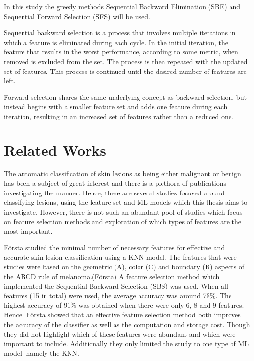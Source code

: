 \documentclass{kththesis}
\begin{document}
In this study the greedy methods Sequential Backward Elimination (SBE) and Sequential Forward Selection (SFS) will be used.

Sequential backward selection is a process that involves multiple iterations in which a feature is eliminated during each cycle. In the initial iteration, the feature that results in the worst performance, according to some metric, when removed is excluded from the set. The process is then repeated with the updated set of features. This process is continued until the desired number of features are left. %

Forward selection shares the same underlying concept as backward selection, but instead begins with a smaller feature set and adds one feature during each iteration, resulting in an increased set of features rather than a reduced one.


\section{Related Works}


The automatic classification of skin lesions as being either malignant or benign has been a subject of great interest and there is a plethora of publications investigating the manner. Hence, there are several studies focused around classifying lesions, using the feature set and ML models which this thesis aims to investigate. However, there is not such an abundant pool of studies which focus on feature selection methods and exploration of which types of features are the most important. 

Första studied the minimal number of necessary features for effective and accurate skin lesion classification using a KNN-model.  The features that were studies were based on the geometric (A), color (C)  and boundary (B) aspects of the ABCD rule of melanoma.(Första) A feature selection method which implemented the Sequential Backward Selection (SBS) was used. When all features (15 in total) were used, the average accuracy was around 78\%. The highest accuracy of 91\% was obtained when there were only 6, 8 and 9 features. Hence, Första showed that an effective feature selection method both improves the accuracy of the classifier as well as the computation and storage cost. Though they did not highlight which of these features were abundant and which were important to include. Additionally they only limited the study to one type of ML model, namely the KNN. 
\end{document}

